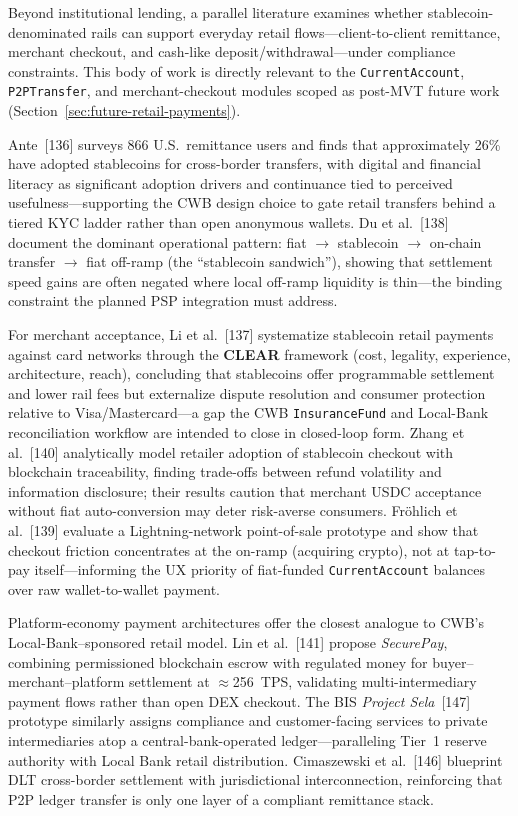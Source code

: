 \documentclass[12pt,a4paper]{report}
\begin{document}
Beyond institutional lending, a parallel literature examines whether stablecoin-denominated rails can support everyday retail flows---client-to-client remittance, merchant checkout, and cash-like deposit/withdrawal---under compliance constraints. This body of work is directly relevant to the \texttt{CurrentAccount}, \texttt{P2PTransfer}, and merchant-checkout modules scoped as post-MVT future work (Section~\ref{sec:future-retail-payments}).

Ante~[136] surveys 866 U.S.\ remittance users and finds that approximately 26\% have adopted stablecoins for cross-border transfers, with digital and financial literacy as significant adoption drivers and continuance tied to perceived usefulness---supporting the CWB design choice to gate retail transfers behind a tiered KYC ladder rather than open anonymous wallets. Du et al.~[138] document the dominant operational pattern: fiat $\to$ stablecoin $\to$ on-chain transfer $\to$ fiat off-ramp (the ``stablecoin sandwich''), showing that settlement speed gains are often negated where local off-ramp liquidity is thin---the binding constraint the planned PSP integration must address.

For merchant acceptance, Li et al.~[137] systematize stablecoin retail payments against card networks through the \textbf{CLEAR} framework (cost, legality, experience, architecture, reach), concluding that stablecoins offer programmable settlement and lower rail fees but externalize dispute resolution and consumer protection relative to Visa/Mastercard---a gap the CWB \texttt{InsuranceFund} and Local-Bank reconciliation workflow are intended to close in closed-loop form. Zhang et al.~[140] analytically model retailer adoption of stablecoin checkout with blockchain traceability, finding trade-offs between refund volatility and information disclosure; their results caution that merchant USDC acceptance without fiat auto-conversion may deter risk-averse consumers. Fr\"{o}hlich et al.~[139] evaluate a Lightning-network point-of-sale prototype and show that checkout friction concentrates at the on-ramp (acquiring crypto), not at tap-to-pay itself---informing the UX priority of fiat-funded \texttt{CurrentAccount} balances over raw wallet-to-wallet payment.

Platform-economy payment architectures offer the closest analogue to CWB's Local-Bank--sponsored retail model. Lin et al.~[141] propose \textit{SecurePay}, combining permissioned blockchain escrow with regulated money for buyer--merchant--platform settlement at $\approx$256~TPS, validating multi-intermediary payment flows rather than open DEX checkout. The BIS \textit{Project Sela}~[147] prototype similarly assigns compliance and customer-facing services to private intermediaries atop a central-bank-operated ledger---paralleling Tier~1 reserve authority with Local Bank retail distribution. Cimaszewski et al.~[146] blueprint DLT cross-border settlement with jurisdictional interconnection, reinforcing that P2P ledger transfer is only one layer of a compliant remittance stack.
\end{document}
